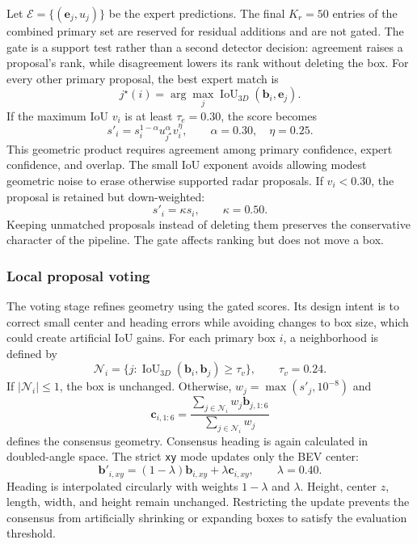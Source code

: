 \documentclass[sensors,article,submit,pdftex,moreauthors]{Definitions/mdpi}
\begin{document}
Let $\mathcal{E}=\{(\mathbf{e}_j,u_j)\}$ be the expert predictions. The final
$K_r=50$ entries of the combined primary set are reserved for residual
additions and are not gated. The gate is a support test rather than a second
detector decision: agreement raises a proposal's rank, while disagreement
lowers its rank without deleting the box. For every other primary proposal, the
best expert match is
\begin{equation}
j^\star(i)=\arg\max_j
\operatorname{IoU}_{3D}(\mathbf{b}_i,\mathbf{e}_j).
\end{equation}
If the maximum IoU $v_i$ is at least $\tau_e=0.30$, the score becomes
\begin{equation}
s'_i=s_i^{1-\alpha}u_{j^\star}^{\alpha}v_i^\eta,
\qquad \alpha=0.30,\quad \eta=0.25.
\label{eq:quality-gate}
\end{equation}
This geometric product requires agreement among primary confidence, expert
confidence, and overlap. The small IoU exponent avoids allowing modest
geometric noise to erase otherwise supported radar proposals. If $v_i<0.30$,
the proposal is retained but down-weighted:
\begin{equation}
s'_i=\kappa s_i,\qquad \kappa=0.50.
\end{equation}
Keeping unmatched proposals instead of deleting them preserves the conservative
character of the pipeline. The gate affects ranking but does not move a box.

\subsubsection{Local proposal voting}

The voting stage refines geometry using the gated scores. Its design intent is
to correct small center and heading errors while avoiding changes to box size,
which could create artificial IoU gains. For each primary box
$i$, a neighborhood is defined by
\begin{equation}
\mathcal{N}_i=\{j:
\operatorname{IoU}_{3D}(\mathbf{b}_i,\mathbf{b}_j)\geq\tau_v\},
\qquad \tau_v=0.24.
\end{equation}
If $\lvert\mathcal{N}_i\rvert\leq1$, the box is unchanged. Otherwise,
$w_j=\max(s'_j,10^{-8})$ and
\begin{equation}
\mathbf{c}_{i,1:6}=
\frac{\sum_{j\in\mathcal{N}_i}w_j\mathbf{b}_{j,1:6}}
{\sum_{j\in\mathcal{N}_i}w_j}
\end{equation}
defines the consensus geometry. Consensus heading is again calculated in
doubled-angle space. The strict \texttt{xy} mode updates only the BEV center:
\begin{equation}
\mathbf{b}'_{i,xy}=(1-\lambda)\mathbf{b}_{i,xy}
+\lambda\mathbf{c}_{i,xy},
\qquad \lambda=0.40.
\label{eq:voting}
\end{equation}
Heading is interpolated circularly with weights $1-\lambda$ and $\lambda$.
Height, center $z$, length, width, and height remain unchanged. Restricting the
update prevents the consensus from artificially shrinking or expanding boxes
to satisfy the evaluation threshold.
\end{document}
